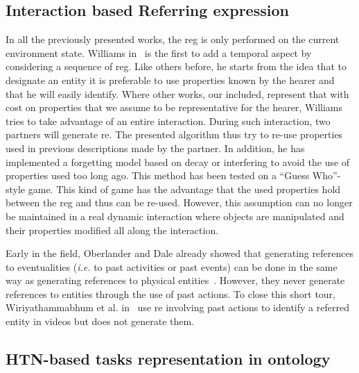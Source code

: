 \subsection{Interaction based Referring expression}

In all the previously presented works, the \acrshort{reg} is only performed on the current environment state. Williams in~\cite{williams_2020_toward} is the first to add a temporal aspect by considering a sequence of \acrshort{reg}. Like others before, he starts from the idea that to designate an entity it is preferable to use properties known by the hearer and that he will easily identify. Where other works, our included, represent that with cost on properties that we assume to be representative for the hearer, Williams tries to take advantage of an entire interaction. During such interaction, two partners will generate \acrshort{re}. The presented algorithm thus try to re-use properties used in previous descriptions made by the partner. In addition, he has implemented a forgetting model based on decay or interfering to avoid the use of properties used too long ago. This method has been tested on a ``Guess Who''-style game. This kind of game has the advantage that the used properties hold between the \acrshort{reg} and thus can be re-used. However, this assumption can no longer be maintained in a real dynamic interaction where objects are manipulated and their properties modified all along the interaction.

Early in the field, Oberlander and Dale already showed that generating references to eventualities (\textit{i.e.} to past activities or past events) can be done in the same way as generating references to physical entities~\cite{oberlander_1991_generating}. However, they never generate references to entities through the use of past actions. To close this short tour, Wiriyathammabhum et al. in~\cite{wiriyathammabhum_2019_referring} use \acrshort{re} involving past actions to identify a referred entity in videos but does not generate them.


\subsection{HTN-based tasks representation in ontology}

